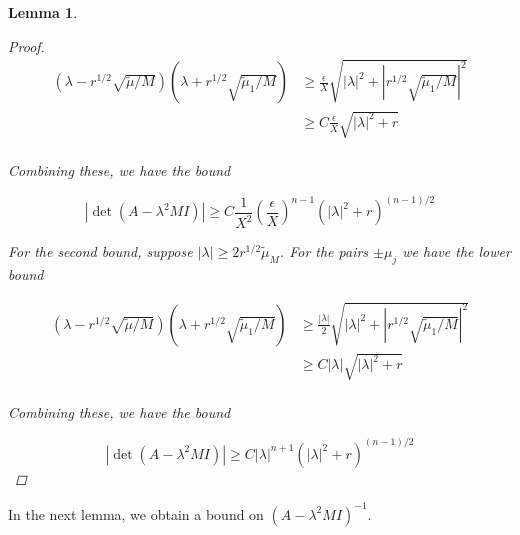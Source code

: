 \documentclass[12pt]{article}
\newtheorem{lemma}{Lemma}
\begin{document}
\begin{lemma}
\begin{proof}
\begin{align*}
(\lambda - r^{1/2} \sqrt{\tilde{\mu}/M} )(\lambda + r^{1/2} \sqrt{\tilde{\mu}_1/M} )
&\geq \frac{\epsilon}{X} \sqrt{ |\lambda|^2 + |r^{1/2} \sqrt{\tilde{\mu}_1/M}|^2 } \\
&\geq C \frac{\epsilon}{X} \sqrt{ |\lambda|^2 + r } \\
\end{align*}

Combining these, we have the bound

\[
|\det(A - \lambda^2 M I)|
\geq C \frac{1}{X^2} \left( \frac{\epsilon}{X} \right)^{n-1} \left( |\lambda|^2 + r \right)^{(n-1)/2}
\]

For the second bound, suppose $|\lambda| \geq 2 r^{1/2} \tilde{\mu}_M$. For the pairs $\pm \mu_j$ we have the lower bound

\begin{align*}
(\lambda - r^{1/2} \sqrt{\tilde{\mu}/M} )(\lambda + r^{1/2} \sqrt{\tilde{\mu}_1/M} )
&\geq \frac{|\lambda|}{2} \sqrt{ |\lambda|^2 + |r^{1/2} \sqrt{\tilde{\mu}_1/M}|^2 } \\
&\geq C |\lambda| \sqrt{ |\lambda|^2 + r } \\
\end{align*}

Combining these, we have the bound

\[
|\det(A - \lambda^2 M I)|
\geq C |\lambda|^{n+1} \left( |\lambda|^2 + r \right)^{(n-1)/2}
\]

\end{proof}
\end{lemma}

In the next lemma, we obtain a bound on $(A - \lambda^2 M I)^{-1}$.

\end{document}
